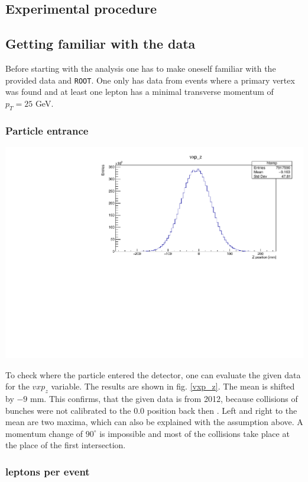 \documentclass[12pt, a4paper, bibliography=totoc]{scrartcl}
\begin{document}
\begin{multicols}{2}
\section{Experimental procedure}

\subsection{Getting familiar with the data}
Before starting with the analysis one has to make oneself familiar with the provided data and \verb*+ROOT+.
One only has data from events where a primary vertex was found and at least one lepton has a minimal transverse momentum of $p_{T} = 25$ \si{GeV}.

\subsubsection{Particle entrance}
\begin{center}
	\includegraphics[width=0.8\linewidth]{fig/vxp_z_redo.pdf}
	\label{vxp_z}
\end{center}
To check where the particle entered the detector, one can evaluate the given data for the $vxp_z$ variable. 
The results are shown in fig. \ref{vxp_z}.
The mean is shifted by $-9$ \si{mm}. 
This confirms, that the given data is from 2012, because collisions of bunches were not calibrated to the $0.0$ position back then \cite{atlasbeamspot}.
Left and right to the mean are two maxima, which can also be explained with the assumption above. 
A momentum change of $90 ^\circ$ is impossible and most of the collisions take place at the place of the first intersection.

\subsubsection{leptons per event}


\end{multicols}
\end{document}

